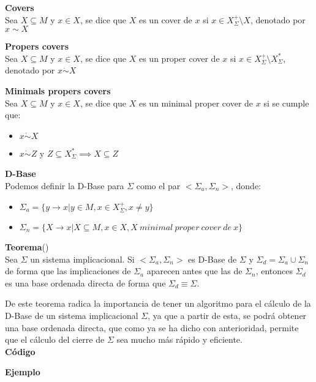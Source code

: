 \textbf{Covers}\\
Sea \(X \subseteq M\) y \(x \in X\), se dice que \(X\) es un cover de \(x\) si \(x \in X^+_{\Sigma} \setminus X\), denotado por \(x \sim X\)

\textbf{Propers covers} \\
Sea \(X \subseteq M\) y \(x \in X\), se dice que \(X\) es un proper cover de \(x\) si \(x \in X^+_{\Sigma} \setminus X^*_{\Sigma}\), denotado por \(x \dot\sim X\)

\textbf{Minimals propers covers}\\
Sea \(X \subseteq M\) y \(x \in X\), se dice que \(X\) es un minimal proper cover de \(x\) si se cumple que:
\begin{itemize}
    \item \(x \dot\sim X\)
    \item \(x \dot\sim Z\) y \(Z \subseteq X^*_{\Sigma} \implies X \subseteq Z\)
\end{itemize}

\textbf{D-Base}\\
Podemos definir la D-Base para \(\Sigma\) como el par \(<\Sigma_a, \Sigma_n>\), donde:

\begin{itemize}
    \item \(\Sigma_a = \{y \to x | y \in M, x \in X^+_{\Sigma}, x \neq y \} \)
    \item \(\Sigma_n = \{X \to x | X \subseteq M, x \in X, X \ minimal \ proper \ cover \ de \ x\} \)

\end{itemize}

\textbf{Teorema}(\cite{Adaricheva})\\
Sea \(\Sigma\) un sistema implicacional. Si \(<\Sigma_a, \Sigma_n>\) es D-Base de \(\Sigma\) y \(\Sigma_d = \Sigma_a\cup \Sigma_n\) de forma que las implicaciones de \(\Sigma_a\) aparecen antes que las de \(\Sigma_n\), entonces \(\Sigma_d\) es una base ordenada directa de forma que \(\Sigma_d \equiv \Sigma\).

De este teorema radica la importancia de tener un algoritmo para el c\'alculo de la D-Base de un sistema implicacional \(\Sigma\), ya que a partir de esta, se podr\'a obtener una base ordenada directa, que como ya se ha dicho con anterioridad, permite que el c\'alculo del cierre de \(\Sigma\) sea mucho m\'as r\'apido y eficiente.\\


\newpage 
\textbf{C\'odigo} 

\newpage
\textbf{Ejemplo}

